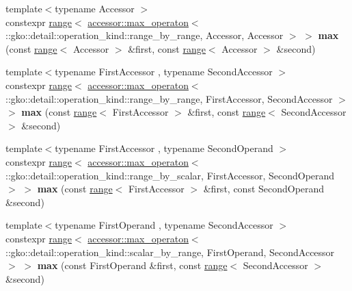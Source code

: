 \begin{DoxyCompactItemize}
\item 
\mbox{\label{namespacegko_a9525dbd3cab0f88c517605970eeec941}} 
{\footnotesize template$<$typename Accessor $>$ }\\constexpr \hyperlink{classgko_1_1range}{range}$<$ \hyperlink{structgko_1_1accessor_1_1max__operaton}{accessor\+::max\+\_\+operaton}$<$ \+::gko\+::detail\+::operation\+\_\+kind\+::range\+\_\+by\+\_\+range, Accessor, Accessor $>$ $>$ {\bfseries max} (const \hyperlink{classgko_1_1range}{range}$<$ Accessor $>$ \&first, const \hyperlink{classgko_1_1range}{range}$<$ Accessor $>$ \&second)
\item 
\mbox{\label{namespacegko_a6953ed43df70b724348be1ee86e086c0}} 
{\footnotesize template$<$typename First\+Accessor , typename Second\+Accessor $>$ }\\constexpr \hyperlink{classgko_1_1range}{range}$<$ \hyperlink{structgko_1_1accessor_1_1max__operaton}{accessor\+::max\+\_\+operaton}$<$ \+::gko\+::detail\+::operation\+\_\+kind\+::range\+\_\+by\+\_\+range, First\+Accessor, Second\+Accessor $>$ $>$ {\bfseries max} (const \hyperlink{classgko_1_1range}{range}$<$ First\+Accessor $>$ \&first, const \hyperlink{classgko_1_1range}{range}$<$ Second\+Accessor $>$ \&second)
\item 
\mbox{\label{namespacegko_a12db47e6880294113f8cfc3b260b5c44}} 
{\footnotesize template$<$typename First\+Accessor , typename Second\+Operand $>$ }\\constexpr \hyperlink{classgko_1_1range}{range}$<$ \hyperlink{structgko_1_1accessor_1_1max__operaton}{accessor\+::max\+\_\+operaton}$<$ \+::gko\+::detail\+::operation\+\_\+kind\+::range\+\_\+by\+\_\+scalar, First\+Accessor, Second\+Operand $>$ $>$ {\bfseries max} (const \hyperlink{classgko_1_1range}{range}$<$ First\+Accessor $>$ \&first, const Second\+Operand \&second)
\item 
\mbox{\label{namespacegko_a4e1cf347b60113f5504144cf885be230}} 
{\footnotesize template$<$typename First\+Operand , typename Second\+Accessor $>$ }\\constexpr \hyperlink{classgko_1_1range}{range}$<$ \hyperlink{structgko_1_1accessor_1_1max__operaton}{accessor\+::max\+\_\+operaton}$<$ \+::gko\+::detail\+::operation\+\_\+kind\+::scalar\+\_\+by\+\_\+range, First\+Operand, Second\+Accessor $>$ $>$ {\bfseries max} (const First\+Operand \&first, const \hyperlink{classgko_1_1range}{range}$<$ Second\+Accessor $>$ \&second)

\end{DoxyCompactItemize}
